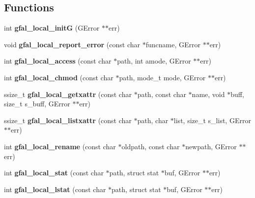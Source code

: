 \subsection*{Functions}
\begin{CompactItemize}
\item 
int \textbf{gfal\_\-local\_\-init\-G} (GError $\ast$$\ast$err)\label{gfal__posix__local__file_8c_3018fb6ca27f7e5da4056bcfc5b76713}

\item 
void \textbf{gfal\_\-local\_\-report\_\-error} (const char $\ast$funcname, GError $\ast$$\ast$err)\label{gfal__posix__local__file_8c_2de9f8c077a2d44c1f4c1656ac5a20fc}

\item 
int \textbf{gfal\_\-local\_\-access} (const char $\ast$path, int amode, GError $\ast$$\ast$err)\label{gfal__posix__local__file_8c_a98ca73fb3083a78f5d85b1f298a8b97}

\item 
int \textbf{gfal\_\-local\_\-chmod} (const char $\ast$path, mode\_\-t mode, GError $\ast$$\ast$err)\label{gfal__posix__local__file_8c_d6c6d5590083bbcef4833f8186a629f3}

\item 
ssize\_\-t \textbf{gfal\_\-local\_\-getxattr} (const char $\ast$path, const char $\ast$name, void $\ast$buff, size\_\-t s\_\-buff, GError $\ast$$\ast$err)\label{gfal__posix__local__file_8c_6f5556fe718ce94ebbf6ae370b0ef682}

\item 
ssize\_\-t \textbf{gfal\_\-local\_\-listxattr} (const char $\ast$path, char $\ast$list, size\_\-t s\_\-list, GError $\ast$$\ast$err)\label{gfal__posix__local__file_8c_b394025dfe400fe90fd7a692fd7eafea}

\item 
int \textbf{gfal\_\-local\_\-rename} (const char $\ast$oldpath, const char $\ast$newpath, GError $\ast$$\ast$err)\label{gfal__posix__local__file_8c_360b4701633deaae52f9f77c94173405}

\item 
int \textbf{gfal\_\-local\_\-stat} (const char $\ast$path, struct stat $\ast$buf, GError $\ast$$\ast$err)\label{gfal__posix__local__file_8c_dc96268400be1d41613ab796237c1cb8}

\item 
int \textbf{gfal\_\-local\_\-lstat} (const char $\ast$path, struct stat $\ast$buf, GError $\ast$$\ast$err)\label{gfal__posix__local__file_8c_5ad87b117d838e861e51a0999307cc71}


\end{CompactItemize}

